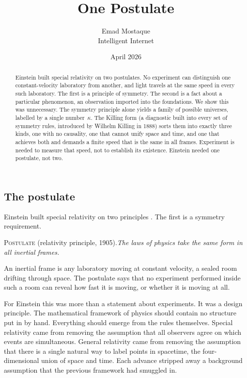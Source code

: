 \documentclass[11pt]{article}
\title{\vspace{-1.5em}\textbf{One Postulate}}
\author{Emad Mostaque\\[2pt]{\normalsize Intelligent Internet}}
\date{April 2026}
\begin{document}
\maketitle
\thispagestyle{empty}
\vspace{-1.5em}

\begin{abstract}
\noindent Einstein built special relativity on two postulates. No experiment can distinguish one constant-velocity laboratory from another, and light travels at the same speed in every such laboratory. The first is a principle of symmetry. The second is a fact about a particular phenomenon, an observation imported into the foundations. We show this was unnecessary. The symmetry principle alone yields a family of possible universes, labelled by a single number~$\kappa$. The Killing form (a diagnostic built into every set of symmetry rules, introduced by Wilhelm Killing in 1888) sorts them into exactly three kinds, one with no causality, one that cannot unify space and time, and one that achieves both and demands a finite speed that is the same in all frames. Experiment is needed to measure that speed, not to establish its existence. Einstein needed one postulate, not two.
\end{abstract}


\subsection*{The postulate}

Einstein built special relativity on two principles \cite{Einstein1905}. The first is a symmetry requirement.

\textsc{Postulate} (relativity principle, 1905)\textsc{.}\quad\emph{The laws of physics take the same form in all inertial frames.}

\smallskip
An inertial frame is any laboratory moving at constant velocity, a sealed room drifting through space. The postulate says that no experiment performed inside such a room can reveal how fast it is moving, or whether it is moving at all.

For Einstein this was more than a statement about experiments. It was a design principle. The mathematical framework of physics should contain no structure put in by hand. Everything should emerge from the rules themselves. Special relativity came from removing the assumption that all observers agree on which events are simultaneous. General relativity came from removing the assumption that there is a single natural way to label points in spacetime, the four-dimensional union of space and time. Each advance stripped away a background assumption that the previous framework had smuggled in.
\end{document}
